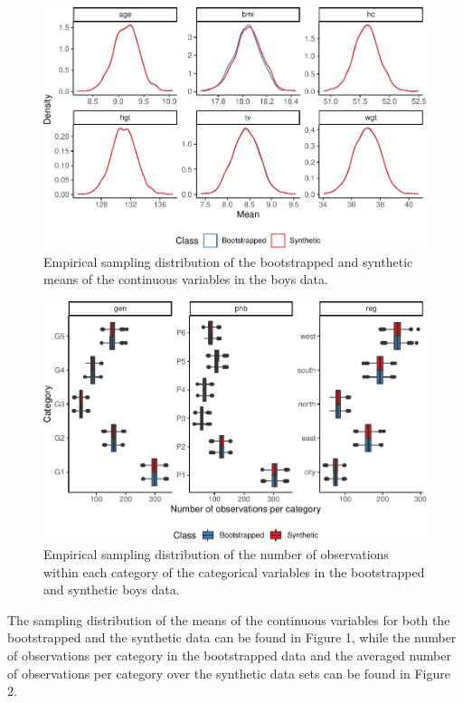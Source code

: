 \documentclass[psych,article,submit,moreauthors,pdftex]{mdpi}
\begin{document}
\begin{figure}
\centering
\includegraphics{Manuscript_files/figure-latex/univariate-statistics-1.pdf}
\caption{Empirical sampling distribution of the bootstrapped and
synthetic means of the continuous variables in the boys data.}
\end{figure}

\begin{figure}
\centering
\includegraphics{Manuscript_files/figure-latex/univariate-statistics-II-1.pdf}
\caption{Empirical sampling distribution of the number of observations
within each category of the categorical variables in the bootstrapped
and synthetic boys data.}
\end{figure}

The sampling distribution of the means of the continuous variables for
both the bootstrapped and the synthetic data can be found in Figure 1,
while the number of observations per category in the bootstrapped data
and the averaged number of observations per category over the synthetic
data sets can be found in Figure 2.
\end{document}
